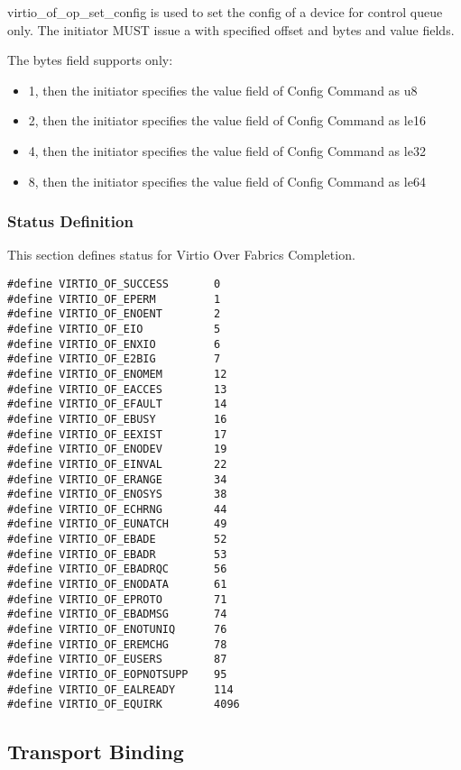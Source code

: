 virtio_of_op_set_config is used to set the config of a device for control queue only.
The initiator MUST issue a  with specified offset and bytes and value fields.

The bytes field supports only:

\begin{itemize}
\item 1, then the initiator specifies the value field of Config Command as u8
\item 2, then the initiator specifies the value field of Config Command as le16
\item 4, then the initiator specifies the value field of Config Command as le32
\item 8, then the initiator specifies the value field of Config Command as le64
\end{itemize}

\subsubsection{Status Definition}\label{sec:Virtio Transport Options / Virtio Over Fabrics / Transmission Protocol / Status Definition}
This section defines status for Virtio Over Fabrics Completion.

\begin{lstlisting}
#define VIRTIO_OF_SUCCESS       0
#define VIRTIO_OF_EPERM         1
#define VIRTIO_OF_ENOENT        2
#define VIRTIO_OF_EIO           5
#define VIRTIO_OF_ENXIO         6
#define VIRTIO_OF_E2BIG         7
#define VIRTIO_OF_ENOMEM        12
#define VIRTIO_OF_EACCES        13
#define VIRTIO_OF_EFAULT        14
#define VIRTIO_OF_EBUSY         16
#define VIRTIO_OF_EEXIST        17
#define VIRTIO_OF_ENODEV        19
#define VIRTIO_OF_EINVAL        22
#define VIRTIO_OF_ERANGE        34
#define VIRTIO_OF_ENOSYS        38
#define VIRTIO_OF_ECHRNG        44
#define VIRTIO_OF_EUNATCH       49
#define VIRTIO_OF_EBADE         52
#define VIRTIO_OF_EBADR         53
#define VIRTIO_OF_EBADRQC       56
#define VIRTIO_OF_ENODATA       61
#define VIRTIO_OF_EPROTO        71
#define VIRTIO_OF_EBADMSG       74
#define VIRTIO_OF_ENOTUNIQ      76
#define VIRTIO_OF_EREMCHG       78
#define VIRTIO_OF_EUSERS        87
#define VIRTIO_OF_EOPNOTSUPP    95
#define VIRTIO_OF_EALREADY      114
#define VIRTIO_OF_EQUIRK        4096
\end{lstlisting}

\subsection{Transport Binding}\label{sec:Virtio Transport Options / Virtio Over Fabrics / Transport Binding}
